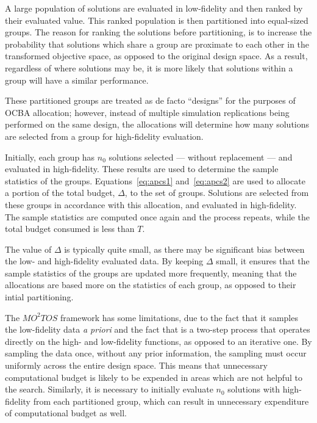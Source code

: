 \documentclass[journal]{IEEEtran}
\begin{document}
A large population of solutions are evaluated in low-fidelity and then ranked by their evaluated value. This ranked population is then partitioned into equal-sized groups. The reason for ranking the solutions before partitioning, is to increase the probability that solutions which share a group are proximate to each other in the transformed objective space, as opposed to the original design space. As a result, regardless of where solutions may be, it is more likely that solutions within a group will have a similar performance.

These partitioned groups are treated as de facto ``designs'' for the purposes of OCBA allocation; however, instead of multiple simulation replications being performed on the same design, the allocations will determine how many solutions are selected from a group for high-fidelity evaluation.

Initially, each group has $n_0$ solutions selected --- without replacement --- and evaluated in high-fidelity. These results are used to determine the sample statistics of the groups. Equations~\ref{eq:apcs1} and~\ref{eq:apcs2} are used to allocate a portion of the total budget, $\Delta$, to the set of groups. Solutions are selected from these groups in accordance with this allocation, and evaluated in high-fidelity. The sample statistics are computed once again and the process repeats, while the total budget consumed is less than $T$.

The value of $\Delta$ is typically quite small, as there may be significant bias between the low- and high-fidelity evaluated data. By keeping $\Delta$ small, it ensures that the sample statistics of the groups are updated more frequently, meaning that the allocations are based more on the statistics of each group, as opposed to their intial partitioning.

The $MO^2TOS$ framework has some limitations, due to the fact that it samples the low-fidelity data \emph{a priori} and the fact that is a two-step process that operates directly on the high- and low-fidelity functions, as opposed to an iterative one. By sampling the data once, without any prior information, the sampling must occur uniformly across the entire design space. This means that unnecessary computational budget is likely to be expended in areas which are not helpful to the search. Similarly, it is necessary to initially evaluate $n_0$ solutions with high-fidelity from each partitioned group, which can result in unnecessary expenditure of computational budget as well.
\end{document}
